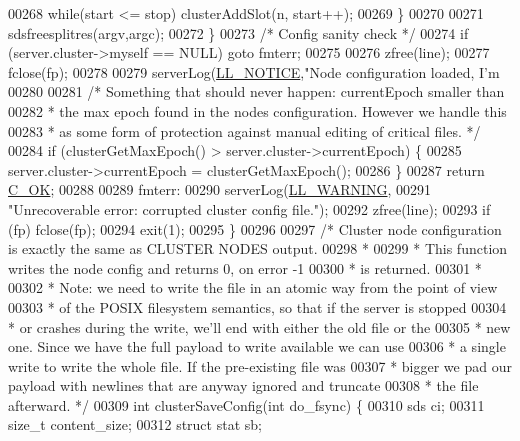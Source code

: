 \begin{DoxyCode}
{{00268             \textcolor{keywordflow}{while}(start <= stop) clusterAddSlot(n, start++);
00269         \}
00270 
00271         sdsfreesplitres(argv,argc);
00272     \}
00273     \textcolor{comment}{/* Config sanity check */}
00274     \textcolor{keywordflow}{if} (server.cluster->myself == NULL) \textcolor{keywordflow}{goto} fmterr;
00275 
00276     zfree(line);
00277     fclose(fp);
00278 
00279     serverLog(\hyperlink{server_8h_a8c54c191e436c7dd3012167212692401}{LL\_NOTICE},\textcolor{stringliteral}{"Node configuration loaded, I'm %
00280 
00281     \textcolor{comment}{/* Something that should never happen: currentEpoch smaller than}
00282 \textcolor{comment}{     * the max epoch found in the nodes configuration. However we handle this}
00283 \textcolor{comment}{     * as some form of protection against manual editing of critical files. */}
00284     \textcolor{keywordflow}{if} (clusterGetMaxEpoch() > server.cluster->currentEpoch) \{
00285         server.cluster->currentEpoch = clusterGetMaxEpoch();
00286     \}
00287     \textcolor{keywordflow}{return} \hyperlink{server_8h_a303769ef1065076e68731584e758d3e1}{C\_OK};
00288 
00289 fmterr:
00290     serverLog(\hyperlink{server_8h_a31229b9334bba7d6be2a72970967a14b}{LL\_WARNING},
00291         \textcolor{stringliteral}{"Unrecoverable error: corrupted cluster config file."});
00292     zfree(line);
00293     \textcolor{keywordflow}{if} (fp) fclose(fp);
00294     exit(1);
00295 \}
00296 
00297 \textcolor{comment}{/* Cluster node configuration is exactly the same as CLUSTER NODES output.}
00298 \textcolor{comment}{ *}
00299 \textcolor{comment}{ * This function writes the node config and returns 0, on error -1}
00300 \textcolor{comment}{ * is returned.}
00301 \textcolor{comment}{ *}
00302 \textcolor{comment}{ * Note: we need to write the file in an atomic way from the point of view}
00303 \textcolor{comment}{ * of the POSIX filesystem semantics, so that if the server is stopped}
00304 \textcolor{comment}{ * or crashes during the write, we'll end with either the old file or the}
00305 \textcolor{comment}{ * new one. Since we have the full payload to write available we can use}
00306 \textcolor{comment}{ * a single write to write the whole file. If the pre-existing file was}
00307 \textcolor{comment}{ * bigger we pad our payload with newlines that are anyway ignored and truncate}
00308 \textcolor{comment}{ * the file afterward. */}
00309 \textcolor{keywordtype}{int} clusterSaveConfig(\textcolor{keywordtype}{int} do\_fsync) \{
00310     sds ci;
00311     size\_t content\_size;
00312     \textcolor{keyword}{struct} stat sb;
}}}
\end{DoxyCode}

